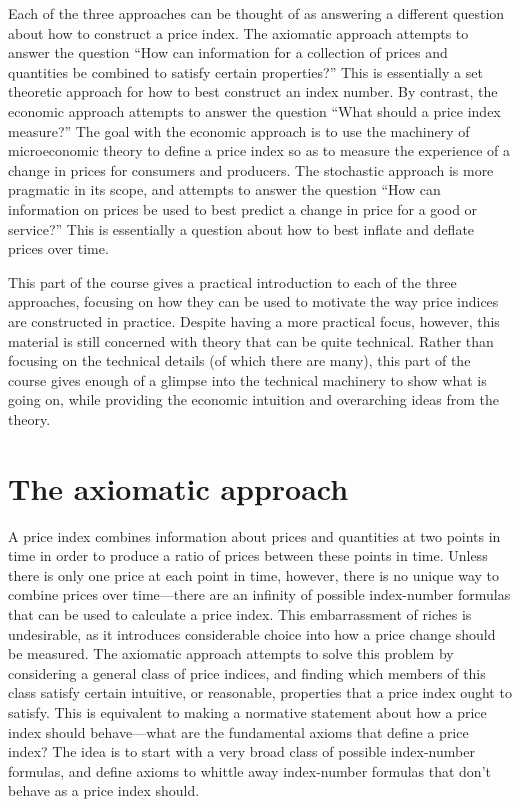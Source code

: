 \documentclass[]{article}
\begin{document}
Each of the three approaches can be thought of as answering a different question about how to construct a price index. The axiomatic approach attempts to answer the question ``How can information for a collection of prices and quantities be combined to satisfy certain properties?'' This is essentially a set theoretic approach for how to best construct an index number. By contrast, the economic approach attempts to answer the question ``What should a price index measure?'' The goal with the economic approach is to use the machinery of microeconomic theory to define a price index so as to measure the experience of a change in prices for consumers and producers. The stochastic approach is more pragmatic in its scope, and attempts to answer the question ``How can information on prices be used to best predict a change in price for a good or service?'' This is essentially a question about how to best inflate and deflate prices over time.

This part of the course gives a practical introduction to each of the three approaches, focusing on how they can be used to motivate the way price indices are constructed in practice. Despite having a more practical focus, however, this material is still concerned with theory that can be quite technical. Rather than focusing on the technical details (of which there are many), this part of the course gives enough of a glimpse into the technical machinery to show what is going on, while providing the economic intuition and overarching ideas from the theory.

\hypertarget{the-axiomatic-approach}{%
\section{The axiomatic approach}\label{the-axiomatic-approach}}

A price index combines information about prices and quantities at two points in time in order to produce a ratio of prices between these points in time. Unless there is only one price at each point in time, however, there is no unique way to combine prices over time---there are an infinity of possible index-number formulas that can be used to calculate a price index. This embarrassment of riches is undesirable, as it introduces considerable choice into how a price change should be measured. The axiomatic approach attempts to solve this problem by considering a general class of price indices, and finding which members of this class satisfy certain intuitive, or reasonable, properties that a price index ought to satisfy. This is equivalent to making a normative statement about how a price index should behave---what are the fundamental axioms that define a price index? The idea is to start with a very broad class of possible index-number formulas, and define axioms to whittle away index-number formulas that don't behave as a price index should.
\end{document}
